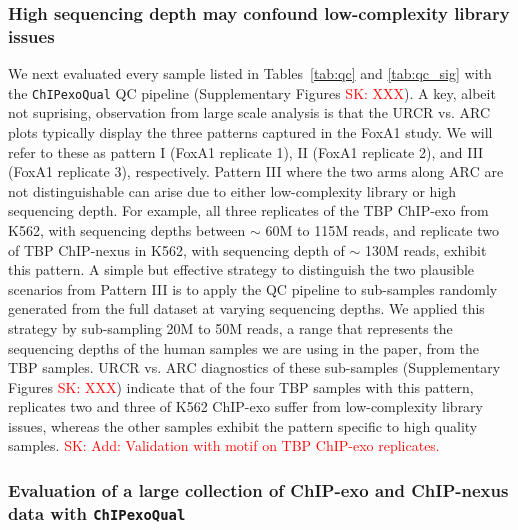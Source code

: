 \documentclass{bmcart}
\newcommand{\pname}[1]{\texttt{ChIPexoQual}}
\newcommand{\SK}[1]{\textcolor{red}{SK: #1}}
\begin{document}
\subsubsection*{High sequencing depth may confound low-complexity library issues}
We next evaluated every sample listed in Tables~\ref{tab:qc} and
\ref{tab:qc_sig} with the \pname{} QC pipeline (Supplementary Figures \SK{XXX}). A key, albeit not suprising, observation from large scale analysis is that  the URCR vs. ARC plots  typically display the three patterns captured in the FoxA1 study. We will refer to these as pattern I (FoxA1 replicate 1), II (FoxA1 replicate 2), and III (FoxA1 replicate 3), respectively. 
Pattern III where the two arms along $\mbox{ARC}$ are not distinguishable can arise due to either low-complexity library or high sequencing depth.  For example, all three replicates of the TBP ChIP-exo from K562, with sequencing depths between $\sim$ 60M to 115M reads, and replicate two of TBP ChIP-nexus in K562, with sequencing depth of $\sim$ 130M reads, exhibit this pattern. A simple but effective strategy to distinguish the two plausible scenarios from Pattern III is to apply the QC pipeline to sub-samples randomly generated from the full dataset at varying sequencing depths.  We applied this strategy by  sub-sampling 20M to 50M reads, a range that represents the 
 sequencing depths of the human samples we are using in the paper, from the TBP samples. 
$\mbox{URCR}$ vs. $\mbox{ARC}$ diagnostics of these sub-samples  (Supplementary Figures \SK{XXX}) indicate that of the four TBP samples with this pattern, replicates two and three of K562 ChIP-exo suffer from low-complexity library issues, whereas the other samples exhibit the pattern specific to high quality samples. \SK{Add: Validation with motif on TBP ChIP-exo replicates.}

  
\subsubsection*{Evaluation of a large collection of ChIP-exo and ChIP-nexus data with \pname{}}
\end{document}
